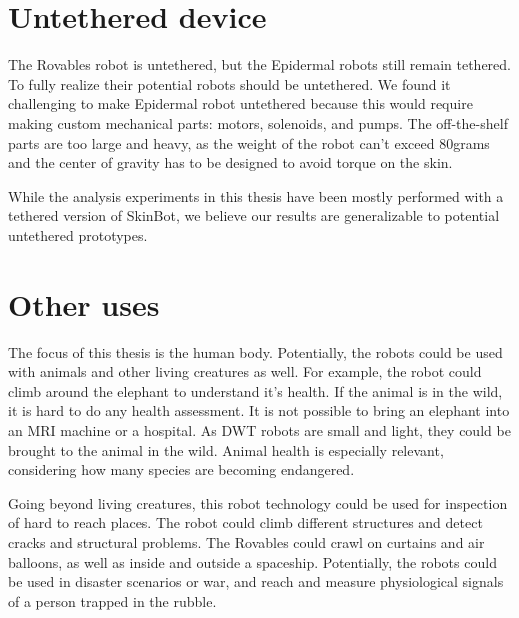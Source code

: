 \section{Untethered device}
The Rovables robot is untethered, but the Epidermal robots still remain tethered. To fully realize their potential robots should be untethered. We found it challenging to make Epidermal robot untethered because this would require making custom mechanical parts: motors, solenoids, and pumps. The off-the-shelf parts are too large and heavy, as the weight of the robot can't exceed 80grams and the center of gravity has to be designed to avoid torque on the skin. 

While the analysis experiments in this thesis have been mostly performed with a tethered version of SkinBot, we believe
our results are generalizable to potential untethered prototypes.

\section{Other uses}
The focus of this thesis is the human body. Potentially, the robots could be used with animals and other living creatures as well.  For example, the robot could climb around the elephant to understand it's health. If the animal is in the wild, it is hard to do any health assessment. It is not possible to bring an elephant into an MRI machine or a hospital. As DWT robots are small and light, they could be brought to the animal in the wild.  Animal health is especially relevant, considering how many species are becoming endangered. 

Going beyond living creatures, this robot technology could be used for inspection of hard to reach places. The robot could climb different structures and detect cracks and structural problems. The Rovables could crawl on curtains and air balloons, as well as inside and outside a spaceship. Potentially, the robots could be used in disaster scenarios or war, and reach and measure physiological signals of a person trapped in the rubble. 